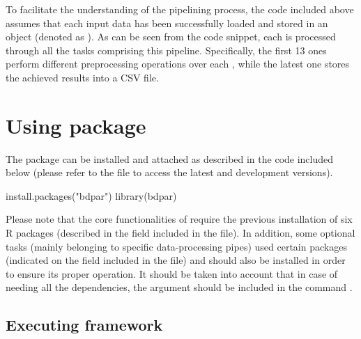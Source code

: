 
To facilitate the understanding of the pipelining process, the code included above assumes that each input data has been successfully loaded and stored in an  object (denoted as ). As can be seen from the code snippet, each  is processed through all the tasks comprising this pipeline. Specifically, the first 13 ones perform different preprocessing operations over each , while the latest one stores the achieved results into a CSV file.

\section{Using  package}

The package can be installed and attached as described in the code included below (please refer to the  file to access the latest and development versions).

\begin{example}
install.packages("bdpar")
library(bdpar)
\end{example}

Please note that the core functionalities of  require the previous installation of six R packages (described in the  field included in the  file). In addition, some optional tasks (mainly belonging to specific data-processing pipes) used certain packages (indicated on the  field included in the  file) and should also be installed in order to ensure its proper operation. It should be taken into account that in case of needing all the dependencies, the argument  should be included in the command .

\subsection{Executing  framework}

